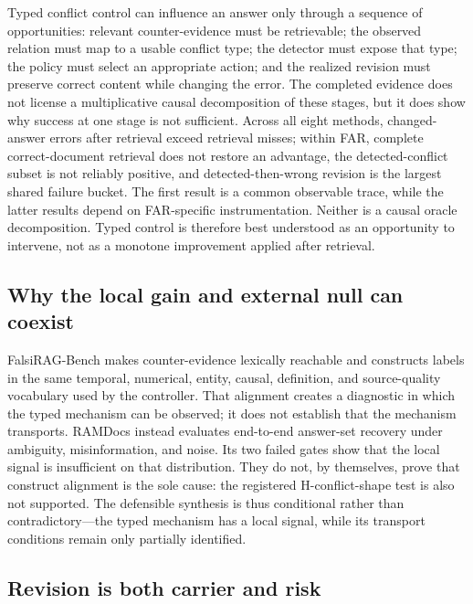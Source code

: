 \documentclass[letterpaper]{article}
\begin{document}
Typed conflict control can influence an answer only through a sequence of
opportunities: relevant counter-evidence must be retrievable; the observed
relation must map to a usable conflict type; the detector must expose that
type; the policy must select an appropriate action; and the realized revision
must preserve correct content while changing the error. The completed evidence
does not license a multiplicative causal decomposition of these stages, but it
does show why success at one stage is not sufficient. Across all eight methods,
changed-answer errors after retrieval exceed retrieval misses; within FAR,
complete correct-document retrieval does not restore an advantage, the
detected-conflict subset is not reliably positive, and detected-then-wrong
revision is the largest shared failure bucket. The first result is a common
observable trace, while the latter results depend on FAR-specific instrumentation.
Neither is a causal oracle decomposition. Typed control is therefore best
understood as an opportunity to intervene, not as a monotone improvement applied
after retrieval.

\subsection{Why the local gain and external null can coexist}

FalsiRAG-Bench makes counter-evidence lexically reachable and constructs labels
in the same temporal, numerical, entity, causal, definition, and source-quality
vocabulary used by the controller. That alignment creates a diagnostic in
which the typed mechanism can be observed; it does not establish that the
mechanism transports. RAMDocs instead evaluates end-to-end answer-set recovery
under ambiguity, misinformation, and noise. Its two failed gates show that the
local signal is insufficient on that distribution. They do not, by themselves,
prove that construct alignment is the sole cause: the registered
H-conflict-shape test is also not supported. The defensible synthesis is thus
conditional rather than contradictory---the typed mechanism has a local signal,
while its transport conditions remain only partially identified.

\subsection{Revision is both carrier and risk}
\end{document}
